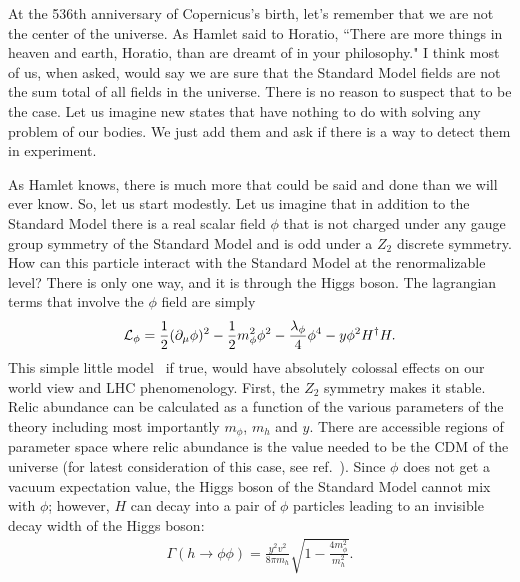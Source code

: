 \documentclass[12pt]{article}
\def\beq{\begin{eqnarray}}
\def\eeq{\end{eqnarray}}
\begin{document}
At the 536th anniversary of Copernicus's birth, let's remember that we are not the center of the universe. As Hamlet said to Horatio, ``There are more things in heaven and earth, Horatio, than are dreamt of in your philosophy."  I think most of us, when asked, would say we are sure that the Standard Model fields are not the sum total of all fields in the universe. There is no reason to suspect that to be the case. Let us imagine new states that have nothing to do with solving any problem of our bodies. We just add them and ask if there is a way to detect them in experiment.

As Hamlet knows, there is much more that could be said and done than we will ever know. So, let us start modestly. Let us imagine that in addition to the Standard Model there is a real scalar field $\phi$ that is not charged under any gauge group symmetry of the Standard Model and is odd under a $Z_2$ discrete symmetry.  How can this particle interact with the Standard Model at the renormalizable level?  There is only one way, and it is through the Higgs boson. The lagrangian terms that involve the $\phi$ field are simply
\beq
{\cal L}_\phi= \frac{1}{2}(\partial_\mu \phi)^2-\frac{1}{2}m^2_\phi\phi^2-\frac{\lambda_\phi}{4}\phi^4-y\phi^2H^\dagger H.
\eeq
This simple little model~\cite{Burgess:2000yq,Davoudiasl:2004be} 
if true, would have absolutely colossal effects on our world view and LHC phenomenology. First, the $Z_2$ symmetry makes it stable. Relic abundance can be calculated as a function of the various parameters of the theory including most importantly $m_\phi$, $m_h$ and $y$.  There are accessible regions of parameter space where relic abundance is the value needed to be the CDM of the universe (for latest consideration of this case, see ref.~\cite{Barger:2007im}).  Since $\phi$ does not get a vacuum expectation value, the Higgs boson of the Standard Model cannot mix with $\phi$; however, $H$ can decay into a pair of $\phi$ particles leading to an invisible decay width of the Higgs boson:
\beq
\Gamma(h\to\phi\phi)=\frac{y^2 v^2}{8\pi m_h}\sqrt{1-\frac{4m_\phi^2}{m^2_h}}.
\eeq
\end{document}
